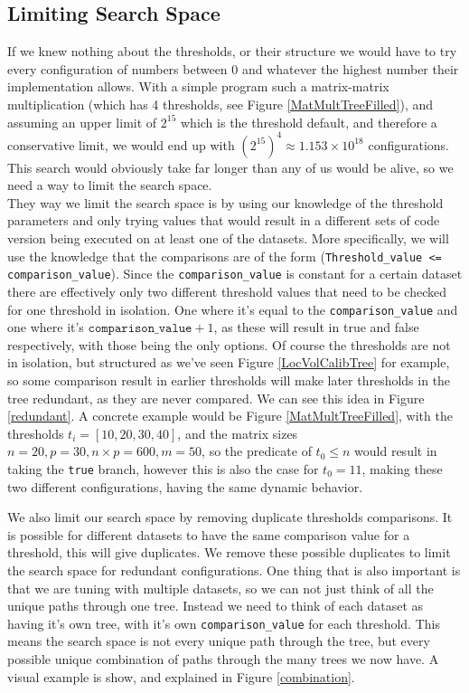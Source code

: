 \subsection{Limiting Search Space}
If we knew nothing about
the thresholds, or their structure we would have to try every configuration of
numbers between 0 and whatever the highest number their implementation allows. 
With a simple program such a matrix-matrix multiplication (which has 4 thresholds, see Figure \ref{MatMultTreeFilled}), and assuming an upper limit of $2^{15}$ which is the threshold default, and therefore a conservative limit,
we would end up with $\left(2^{15}\right)^4 \approx 1.153\times10^{18}$ configurations.
This search would obviously take far longer than any of us would be alive, so we need a way to limit the search space.
\\
They way we limit the search space is by using our knowledge of the threshold
parameters and only trying values that would result in a different sets of code 
version being executed on at least one of the datasets. More specifically, we will
use the knowledge that the comparisons are of the form
(\texttt{Threshold\_value <= comparison\_value}). Since the
\texttt{comparison\_value} is constant for a certain dataset there are effectively
only two different threshold values that need to be checked for one threshold 
in isolation. One where it's equal to the \texttt{comparison\_value} and one
where it's $\texttt{comparison\_value} + 1$, as these will result in true and
false respectively, with those being the only options.
Of course the thresholds are not in isolation, but structured as we've seen
Figure \ref{LocVolCalibTree} for example, so some comparison result in earlier 
thresholds will make later thresholds in the tree redundant, as they are never compared. We can see this idea in Figure \ref{redundant}. A concrete example would be Figure \ref{MatMultTreeFilled}, with the thresholds $t_i = [10, 20, 30, 40]$, and the matrix sizes $n=20, p=30, n\times p=600, m=50$, so the predicate of $t_0 \leq n$ would result in taking the \texttt{true} branch, however this is also the case for $t_0 = 11$, making these two different configurations, having the same dynamic behavior.

We also limit our search space by removing duplicate thresholds comparisons. It is possible for different datasets to have the same comparison value for a threshold, this will give duplicates. We remove these possible duplicates to limit the search space for redundant configurations.
One thing that is also important is that we are tuning with multiple datasets,
so we can not just think of all the unique paths through one tree. Instead we
need to think of each dataset as having it's own tree, with it's own 
\texttt{comparison\_value} for each threshold. This means the search space is
not every unique path through the tree, but every possible unique combination
of paths through the many trees we now have. A visual example is show, and explained in Figure \ref{combination}. 



